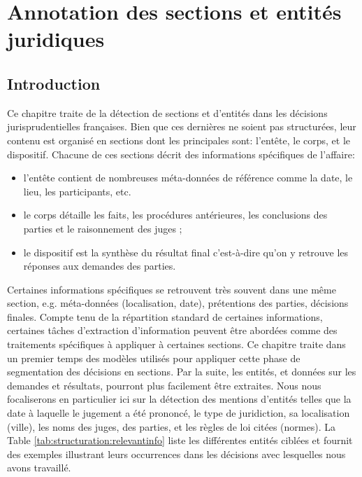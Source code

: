 \chapter{Annotation des sections et entités juridiques}
\label{chap:structuration}


\section{Introduction}
\label{sec:structuration:motivation}
Ce chapitre traite de la détection de sections et d'entités dans les décisions jurisprudentielles françaises. Bien que ces dernières ne soient pas structurées, leur contenu est organisé en sections dont les principales sont: l'entête, le corps, et le dispositif. Chacune de ces sections décrit des informations spécifiques de l'affaire: 
\begin{itemize}
	\item l'entête contient de nombreuses méta-données de référence comme la date, le lieu, les participants, etc.
	\item le corps détaille les faits, les procédures antérieures, les conclusions des parties et le raisonnement des juges ;
	\item le dispositif est la synthèse du résultat final c'est-à-dire qu'on y retrouve les réponses aux demandes des parties.
\end{itemize}

Certaines informations spécifiques se retrouvent très souvent dans une même section, e.g. méta-données (localisation, date), prétentions des parties, décisions finales. Compte tenu de la répartition standard de certaines informations, certaines tâches d'extraction d'information peuvent être abordées comme des traitements spécifiques à appliquer à certaines sections. Ce chapitre traite dans un premier temps des modèles utilisés pour appliquer cette phase de segmentation des décisions en sections. Par la suite, les entités, et données sur les demandes et résultats, pourront plus facilement être extraites. Nous nous focaliserons en particulier ici sur la détection des mentions d'entités telles que la date à laquelle le jugement a été prononcé, le type de juridiction, sa localisation (ville), les noms des juges, des parties, et les règles de loi citées (normes). La Table \ref{tab:structuration:relevantinfo} liste les différentes entités ciblées et fournit des exemples illustrant leurs occurrences dans les décisions avec lesquelles nous avons travaillé.

